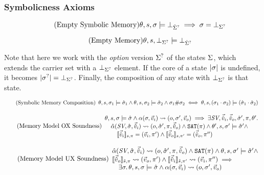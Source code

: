 \subsubsection{Symbolicness Axioms }

\begin{equation}
\tag{Empty Symbolic Memory}\label{eq:empty-sym-mem}
\theta,s,\sigma\models \bot_{\hat{\Sigma}^?} \implies \sigma = \bot_{\Sigma^?}
\end{equation}

\begin{equation}
\tag{Empty Memory}\label{eq:empty-mem}
\theta,s,\bot_{\Sigma^?}\models \bot_{\hat{\Sigma}^?}
\end{equation}

Note that here we work with the \emph{option} version $\Sigma^?$ of the states $\Sigma$, which extends the carrier set with a $\bot_{\Sigma^?}$ element. If the core of a state $|\sigma|$ is undefined, it becomes $|\sigma^?|=\bot_{\Sigma^?}$. Finally, the composition of any state with $\bot_{\Sigma^?}$ is that state.

\begin{equation}
\tag{Symbolic Memory Composition}\label{eq:symbolic-mem-comp}
\begin{array}{l}
\theta,s,\sigma_1\models \hat{\sigma}_1 \land \theta,s,\sigma_2\models \hat{\sigma}_2 \land \sigma_1\#\sigma_2 \iff \theta,s,(\sigma_1\cdot\sigma_2)\models (\hat{\sigma}_1\cdot\hat{\sigma}_2)
\end{array}
\end{equation}

\begin{equation}
\tag{Memory Model OX Soundness}\label{eq:mem-ox-soundness}
\begin{array}{l}
\theta,s,\sigma\models\hat{\sigma} \land \alpha(\sigma,\vec{v}_i)\rightsquigarrow(o,\sigma',\vec{v}_o) \implies \exists \textit{SV}, \vec{\hat{v}}_i,\vec{\hat{v}}_o,\hat{\sigma}',\pi,\theta'\ldotp\\
\quad \hat\alpha(\textit{SV}, \hat{\sigma},\vec{\hat{v}}_i)\rightsquigarrow(o,\hat{\sigma}',\pi,\vec{\hat{v}}_o) \land \operatorname{\texttt{SAT}}(\pi) \land \theta',s,\sigma'\models \hat{\sigma}' \land\\
\qquad \llbracket\vec{\hat{v}}_i\rrbracket_{s,\pi}=(\vec{v}_i,\pi')\land\llbracket\vec{\hat{v}}_o\rrbracket_{s,\pi'}=(\vec{\hat{v}}_o,\pi'')
\end{array}
\end{equation}

\begin{equation}
\tag{Memory Model UX Soundness}\label{eq:mem-ux-soundness}
\begin{array}{l}
\hat\alpha(\textit{SV},\hat{\sigma},\vec{\hat{v}}_i)\rightsquigarrow(o,\hat{\sigma}',\pi,\vec{\hat{v}}_o) \land \operatorname{\texttt{SAT}}(\pi) \land \theta,s,\sigma'\models\hat{\sigma}' \land \\
\llbracket\vec{\hat{v}}_o\rrbracket_{\hat s,\pi}\rightsquigarrow(\vec{v}_o,\pi')\land \llbracket\vec{\hat{v}}_i\rrbracket_{\hat s,\pi'}\rightsquigarrow(\vec{v}_i,\pi'')\implies\\
\quad \exists \sigma\ldotp \theta,s,\sigma\models\hat{\sigma} \land \alpha(\sigma,\vec{v}_i)\rightsquigarrow(o,\sigma',\vec{v}_o)
\end{array}
\end{equation}

